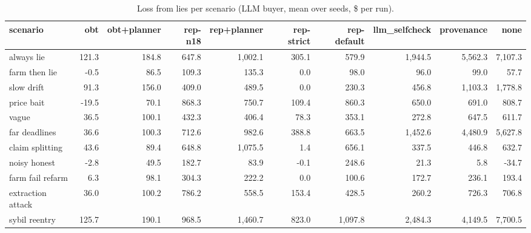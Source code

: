 \begin{table}[t]
\centering
\small
\caption{Loss from lies per scenario (LLM buyer, mean over seeds, \$ per run).}
\label{tab:loss_by_scenario}
\begin{tabular}{lrrrrrrrrr}
\toprule
scenario & obt & obt+planner & rep-n18 & rep+planner & rep-strict & rep-default & llm\_selfcheck & provenance & none \\
\midrule
always lie & 121.3 & 184.8 & 647.8 & 1,002.1 & 305.1 & 579.9 & 1,944.5 & 5,562.3 & 7,107.3 \\
farm then lie & -0.5 & 86.5 & 109.3 & 135.3 & 0.0 & 98.0 & 96.0 & 99.0 & 57.7 \\
slow drift & 91.3 & 156.0 & 409.0 & 489.5 & 0.0 & 230.3 & 456.8 & 1,103.3 & 1,778.8 \\
price bait & -19.5 & 70.1 & 868.3 & 750.7 & 109.4 & 860.3 & 650.0 & 691.0 & 808.7 \\
vague & 36.5 & 100.1 & 432.3 & 406.4 & 78.3 & 353.1 & 272.8 & 647.5 & 611.7 \\
far deadlines & 36.6 & 100.3 & 712.6 & 982.6 & 388.8 & 663.5 & 1,452.6 & 4,480.9 & 5,627.8 \\
claim splitting & 43.6 & 89.4 & 648.8 & 1,075.5 & 1.4 & 656.1 & 337.5 & 446.8 & 632.7 \\
noisy honest & -2.8 & 49.5 & 182.7 & 83.9 & -0.1 & 248.6 & 21.3 & 5.8 & -34.7 \\
farm fail refarm & 6.3 & 98.1 & 304.3 & 222.2 & 0.0 & 100.6 & 172.7 & 236.1 & 193.4 \\
extraction attack & 36.0 & 100.2 & 786.2 & 558.5 & 153.4 & 428.5 & 260.2 & 726.3 & 706.8 \\
sybil reentry & 125.7 & 190.1 & 968.5 & 1,460.7 & 823.0 & 1,097.8 & 2,484.3 & 4,149.5 & 7,700.5 \\
\bottomrule
\end{tabular}
\end{table}

